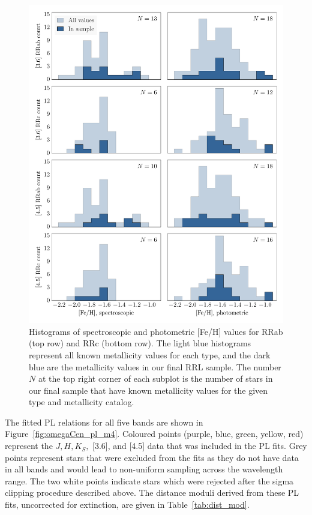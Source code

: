 \documentclass[a4paper,fleqn,usenatbib]{mnras}
\begin{document}
\begin{figure}
\begin{center}
\includegraphics[width=160mm]{reworked_fitting_code/final_plots/metallicity_hists.pdf}
\caption{Histograms of spectroscopic \citep[right column]{2006ApJ...640L..43S} and photometric \citep[left column]{2000AJ....119.1824R} [Fe/H] values for RRab (top row) and RRc (bottom row). The light blue histograms represent all known metallicity values for each type, and the dark blue are the metallicity values in our final RRL sample. The number $N$ at the top right corner of each subplot is the number of stars in our final sample that have known metallicity values for the given type and metallicity catalog.}
\label{fig:metallicity_hists}
\end{center}
\end{figure}

The fitted PL relations for all five bands are shown in Figure~\ref{fig:omegaCen_pl_m4}. Coloured points (purple, blue, green, yellow, red) represent the $J, H, K_S,$ [3.6], and [4.5] data that was included in the PL fits. Grey points represent stars that were excluded from the fits as they do not have data in all bands and would lead to non-uniform sampling across the wavelength range. The two white points indicate stars which were rejected after the sigma clipping procedure described above. The distance moduli derived from these PL fits, uncorrected for extinction, are given in Table~\ref{tab:dist_mod}.
\end{document}
